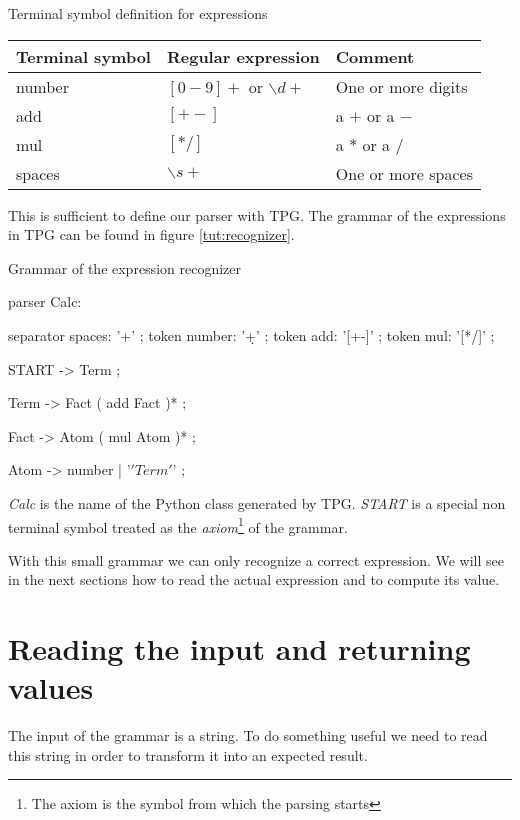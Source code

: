 \begin{tableau}
\caption{Terminal symbol definition for expressions} \label{tut:token_calc}
\begin{tabular}{| l | l | l |}
\hline
	Terminal symbol & Regular expression & Comment \\
\hline
\hline
	number & $[0-9]+$ or $\backslash d+$ & One or more digits \\
\hline
	add & $[+-]$ & a $+$ or a $-$ \\
\hline
	mul & $[*/]$ & a $*$ or a $/$ \\
\hline
	spaces & $\backslash s+$ & One or more spaces \\
\hline
\end{tabular}
\end{tableau}

This is sufficient to define our parser with TPG. The grammar of the expressions in TPG can be found in figure \ref{tut:recognizer}.

\begin{code}
\caption{Grammar of the expression recognizer} \label{tut:recognizer}
\begin{verbatimtab}[4]
parser Calc:

	separator spaces: '\s+' ;
	token number: '\d+' ;
	token add: '[+-]' ;
	token mul: '[*/]' ;

	START -> Term ;

	Term -> Fact ( add Fact )* ;

	Fact -> Atom ( mul Atom )* ;

	Atom -> number | '\(' Term '\)' ;
\end{verbatimtab}
\end{code}

\emph{Calc} is the name of the Python class generated by TPG. \emph{START} is a special non terminal symbol treated as the \emph{axiom}\footnote{The axiom is the symbol from which the parsing starts} of the grammar.

With this small grammar we can only recognize a correct expression. We will see in the next sections how to read the actual expression and to compute its value.

\section{Reading the input and returning values}

The input of the grammar is a string. To do something useful we need to read this string in order to transform it into an expected result.

